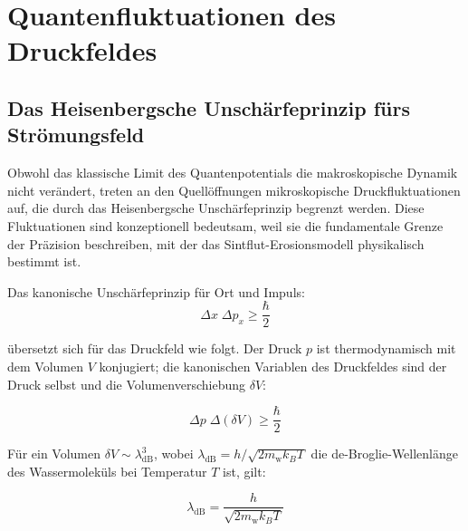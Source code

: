 ﻿\documentclass[12pt,a4paper]{report}
\begin{document}
\section{Quantenfluktuationen des Druckfeldes}
\label{sec:qfluktuationen}

\subsection{Das Heisenbergsche Unschärfeprinzip fürs Strömungsfeld}

Obwohl das klassische Limit des Quantenpotentials die makroskopische Dynamik nicht verändert, treten an den Quellöffnungen mikroskopische Druckfluktuationen auf, die durch das Heisenbergsche Unschärfeprinzip begrenzt werden. Diese Fluktuationen sind konzeptionell bedeutsam, weil sie die fundamentale Grenze der Präzision beschreiben, mit der das Sintflut-Erosionsmodell physikalisch bestimmt ist.

Das kanonische Unschärfeprinzip für Ort und Impuls:
\begin{equation}
	\Delta x\;\Delta p_x \geq \frac{\hbar}{2}
	\label{eq:heisenberg_xp}
\end{equation}

übersetzt sich für das Druckfeld wie folgt. Der Druck $p$ ist thermodynamisch mit dem Volumen $V$ konjugiert; die kanonischen Variablen des Druckfeldes sind der Druck selbst und die Volumenverschiebung $\delta V$:

\begin{equation}
	\Delta p\;\Delta(\delta V) \geq \frac{\hbar}{2}
	\label{eq:heisenberg_pV}
\end{equation}

Für ein Volumen $\delta V \sim \lambda_\mathrm{dB}^3$, wobei $\lambda_\mathrm{dB} = h/\sqrt{2m_\mathrm{w}k_BT}$ die de-Broglie-Wellenlänge des Wassermoleküls bei Temperatur $T$ ist, gilt:

\begin{equation}
	\lambda_\mathrm{dB} = \frac{h}{\sqrt{2m_\mathrm{w}k_BT}}
	\label{eq:de_broglie}
\end{equation}
\end{document}
